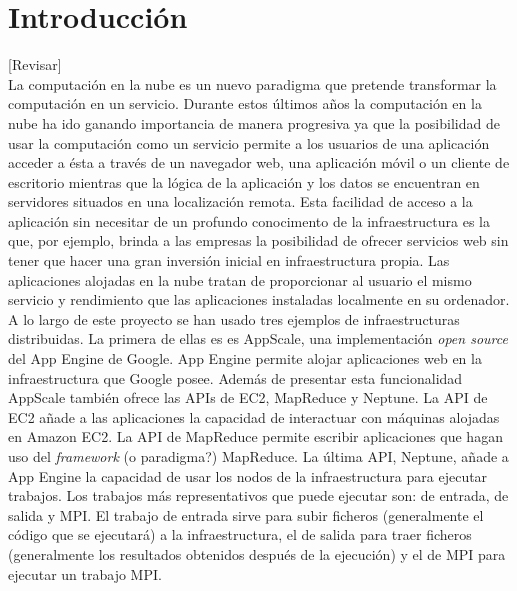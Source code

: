 \chapter{Introducción}
\label{cap:introduccion}

[Revisar]\\

La computación en la nube es un nuevo paradigma que pretende transformar la computación en un servicio. Durante estos últimos años la computación en la nube ha ido ganando importancia de manera progresiva ya que la posibilidad de usar la computación como un servicio permite a los usuarios de una aplicación acceder a ésta a través de un navegador web, una aplicación móvil o un cliente de escritorio mientras que la lógica de la aplicación y los datos se encuentran en servidores situados en una localización remota. Esta facilidad de acceso a la aplicación sin necesitar de un profundo conocimento de la infraestructura es la que, por ejemplo, brinda a las empresas la posibilidad de ofrecer servicios web sin tener que hacer una gran inversión inicial en infraestructura propia. Las aplicaciones alojadas en la nube tratan de proporcionar al usuario el mismo servicio y rendimiento que las aplicaciones instaladas localmente en su ordenador.\\

A lo largo de este proyecto se han usado tres ejemplos de infraestructuras distribuidas. La primera de ellas es es AppScale, una implementación \emph{open source} del App Engine de Google. App Engine permite alojar aplicaciones web en la infraestructura que Google posee. Además de presentar esta funcionalidad AppScale también ofrece las APIs de EC2, MapReduce y Neptune. La API de EC2 añade a las aplicaciones la capacidad de interactuar con máquinas alojadas en Amazon EC2. La API de MapReduce permite escribir aplicaciones que hagan uso del \emph{framework} (o paradigma?) MapReduce. La última API, Neptune, añade a App Engine la capacidad de usar los nodos de la infraestructura para ejecutar trabajos. Los trabajos más representativos que puede ejecutar son: de entrada, de salida y MPI. El trabajo de entrada sirve para subir ficheros (generalmente el código que se ejecutará) a la infraestructura, el de salida para traer ficheros (generalmente los resultados obtenidos después de la ejecución) y el de MPI para ejecutar un trabajo MPI.


